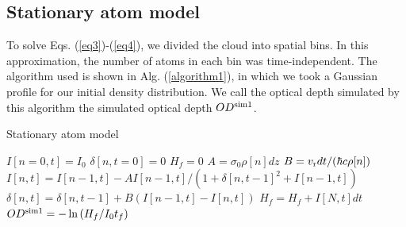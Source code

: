 \documentclass[12pt]{iopart}
\begin{document}
\subsection{Stationary atom model}
To solve Eqs. (\ref{eq3})-(\ref{eq4}), we divided the cloud into spatial bins.  In this approximation, the number of atoms in each bin was time-independent.  The algorithm used is shown in Alg. (\ref{algorithm1}), in which we took a Gaussian profile for our initial density distribution. We call the optical depth simulated by this algorithm the simulated optical depth $OD^{\rm{sim1}}$.

\begin{algorithm}
\caption{Stationary atom model}
\label{algorithm1}
\begin{algorithmic}
\STATE $I[n=0,t]=I_0$ 
\STATE $\delta[n, t=0]=0$ 
\STATE $H_f=0$ 
 \STATE $A=\sigma_0\rho[n] dz$ 
 \STATE $B=v_{\rm{r}} dt/(\hbar c \rho[n])$  
\STATE $I[n,t]=I[n-1,t] - A I[n-1,t]/(1+\delta[n,t-1]^2+I[n-1,t])$  
\STATE $\delta[n,t]=\delta[n,t-1]+B\left(I[n-1,t]-I[n,t]\right)$  
\ENDFOR
\STATE $H_f =H_f+ I[N,t]dt$ 
\ENDFOR
\STATE $OD^{\rm{sim1}}=-\ln{(H_f/I_0t_f)}$
\end{algorithmic}
\end{algorithm}
\end{document}
